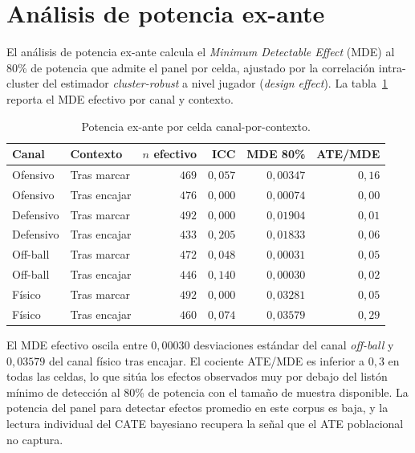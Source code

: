 \section{Análisis de potencia ex-ante}
\label{anexo:val-power}

El análisis de potencia ex-ante calcula el \textit{Minimum Detectable
Effect} (MDE) al 80\% de potencia que admite el panel por celda,
ajustado por la correlación intra-cluster del estimador
\textit{cluster-robust} a nivel jugador (\textit{design effect}). La
tabla~\ref{tab:power} reporta el MDE efectivo por canal y contexto.

\begin{table}[h]
  \centering
  \small
  \caption{Potencia ex-ante por celda canal-por-contexto.}
  \label{tab:power}
  \begin{tabular}{llrrrr}
    \toprule
    Canal & Contexto & $n$ efectivo & ICC & MDE 80\% & ATE/MDE \\
    \midrule
    Ofensivo  & Tras marcar  & $469$ & $0{,}057$ & $0{,}00347$ & $0{,}16$ \\
    Ofensivo  & Tras encajar & $476$ & $0{,}000$ & $0{,}00074$ & $0{,}00$ \\
    Defensivo & Tras marcar  & $492$ & $0{,}000$ & $0{,}01904$ & $0{,}01$ \\
    Defensivo & Tras encajar & $433$ & $0{,}205$ & $0{,}01833$ & $0{,}06$ \\
    Off-ball  & Tras marcar  & $472$ & $0{,}048$ & $0{,}00031$ & $0{,}05$ \\
    Off-ball  & Tras encajar & $446$ & $0{,}140$ & $0{,}00030$ & $0{,}02$ \\
    Físico    & Tras marcar  & $492$ & $0{,}000$ & $0{,}03281$ & $0{,}05$ \\
    Físico    & Tras encajar & $460$ & $0{,}074$ & $0{,}03579$ & $0{,}29$ \\
    \bottomrule
  \end{tabular}
\end{table}

El MDE efectivo oscila entre $0{,}00030$ desviaciones estándar del
canal \textit{off-ball} y $0{,}03579$ del canal físico tras encajar.
El cociente ATE/MDE es inferior a $0{,}3$ en todas las celdas, lo
que sitúa los efectos observados muy por debajo del listón mínimo de
detección al 80\% de potencia con el tamaño de muestra disponible.
La potencia del panel para detectar efectos promedio en este corpus
es baja, y la lectura individual del CATE bayesiano recupera la
señal que el ATE poblacional no captura.

